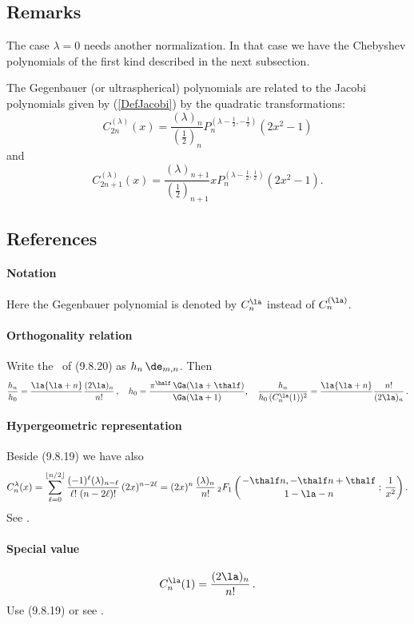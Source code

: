\documentclass[envcountchap,graybox]{svmono}
\newcommand{\hyp}[5]{\mbox{}_{#1}{F}_{#2}
\left(\genfrac{}{}{0pt}{}{#3}{#4}\,;\,#5\right)}
\begin{document}
\subsection*{Remarks}
The case $\lambda=0$ needs another normalization. In that case we have the
Chebyshev polynomials of the first kind described in the next subsection.

\noindent
The Gegenbauer (or ultraspherical) polynomials are related to the Jacobi polynomials
given by (\ref{DefJacobi}) by the quadratic transformations:
$$C_{2n}^{(\lambda)}(x)=\frac{(\lambda)_n}{(\frac{1}{2})_n}
P_n^{(\lambda-\frac{1}{2},-\frac{1}{2})}(2x^2-1)$$
and
$$C_{2n+1}^{(\lambda)}(x)=\frac{(\lambda)_{n+1}}{(\frac{1}{2})_{n+1}}
xP_n^{(\lambda-\frac{1}{2},\frac{1}{2})}(2x^2-1).$$

\subsection*{References}
\label{sec9.8.1}
%
\paragraph{Notation}
Here the Gegenbauer polynomial is denoted by $C_n^\la$ instead of $C_n^{(\la)}$.
%
\paragraph{Orthogonality relation}
Write the \RHS\ of (9.8.20) as $h_n\,\de_{m,n}$. Then
\begin{equation}
\frac{h_n}{h_0}=
\frac\la{\la+n}\,\frac{(2\la)_n}{n!}\,,\quad
h_0=\frac{\pi^\half\,\Ga(\la+\thalf)}{\Ga(\la+1)},\quad
\frac{h_n}{h_0\,(C_n^\la(1))^2}=
\frac\la{\la+n}\,\frac{n!}{(2\la)_n}\,.
\label{61}
\end{equation}
%
\paragraph{Hypergeometric representation}
Beside (9.8.19) we have also
\begin{equation}
C_n^\lambda(x)=\sum_{\ell=0}^{\lfloor n/2\rfloor}\frac{(-1)^{\ell}(\lambda)_{n-\ell}}
{\ell!\;(n-2\ell)!}\,(2x)^{n-2\ell}
=(2x)^{n}\,\frac{(\lambda)_{n}}{n!}\,
\hyp21{-\thalf n,-\thalf n+\thalf}{1-\la-n}{\frac1{x^2}}.
\label{57}
\end{equation}
See .
%
\paragraph{Special value}
\begin{equation}
C_n^{\la}(1)=\frac{(2\la)_n}{n!}\,.
\label{49}
\end{equation}
Use (9.8.19) or see .
%
\end{document}
